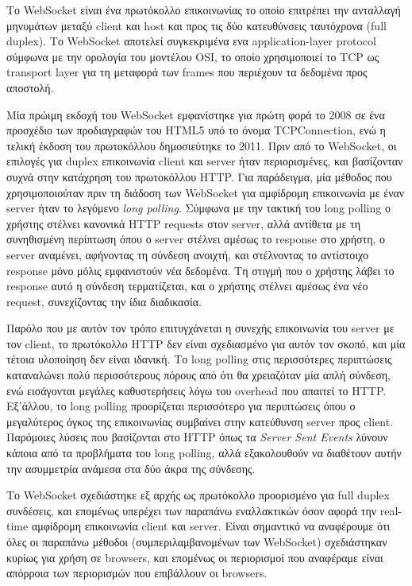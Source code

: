 \documentclass[../thesis.tex]{subfiles}
\begin{document}
Το WebSocket είναι ένα πρωτόκολλο επικοινωνίας το οποίο επιτρέπει την ανταλλαγή μηνυμάτων μεταξύ client και host και προς τις δύο κατευθύνσεις ταυτόχρονα (full duplex).
Το WebSocket αποτελεί συγκεκριμένα ενα application-layer protocol σύμφωνα με την ορολογία του μοντέλου OSI, το οποίο χρησιμοποιεί το TCP ως transport layer για τη μεταφορά των frames που περιέχουν τα δεδομένα προς αποστολή.

\bigskip

Μία πρώιμη εκδοχή του WebSocket εμφανίστηκε για πρώτη φορά το 2008 σε ένα προσχέδιο των προδιαγραφών του HTML5 υπό το όνομα TCPConnection, ενώ η τελική έκδοση του πρωτοκόλλου δημοσιεύτηκε το 2011.
Πριν από το WebSocket, οι επιλογές για duplex επικοινωνία client και server ήταν περιορισμένες, και βασίζονταν συχνά στην κατάχρηση του πρωτοκόλλου HTTP.
Για παράδειγμα, μία μέθοδος που χρησιμοποιούταν πριν τη διάδοση των WebSocket για αμφίδρομη επικοινωνία με έναν server ήταν το λεγόμενο \textit{long polling}.
Σύμφωνα με την τακτική του long polling ο χρήστης στέλνει κανονικά HTTP requests στον server, αλλά αντίθετα με τη συνηθισμένη περίπτωση όπου ο server στέλνει αμέσως το response στο χρήστη, ο server αναμένει, αφήνοντας τη σύνδεση ανοιχτή, και στέλνοντας το αντίστοιχο response μόνο μόλις εμφανιστούν νέα δεδομένα.
Τη στιγμή που ο χρήστης λάβει το response αυτό η σύνδεση τερματίζεται, και ο χρήστης στέλνει αμέσως ένα νέο request, συνεχίζοντας την ίδια διαδικασία.

\bigskip

Παρόλο που με αυτόν τον τρόπο επιτυγχάνεται η συνεχής επικοινωνία του server με τον client, το πρωτόκολλο HTTP δεν είναι σχεδιασμένο για αυτόν τον σκοπό, και μία τέτοια υλοποίηση δεν είναι ιδανική.
Το long polling στις περισσότερες περιπτώσεις καταναλώνει πολύ περισσότερους πόρους από ότι θα χρειαζόταν μία απλή σύνδεση, ενώ εισάγονται μεγάλες καθυστερήσεις λόγω του overhead που απαιτεί το HTTP.
Εξ'άλλου, το long polling προορίζεται περισσότερο για περιπτώσεις όπου ο μεγαλύτερος όγκος της επικοινωνίας συμβαίνει στην κατεύθυνση server προς client.
Παρόμοιες λύσεις που βασίζονται στο HTTP όπως τα \textit{Server Sent Events} λύνουν κάποια από τα προβλήματα του long polling, αλλά εξακολουθούν να διαθέτουν αυτήν την ασυμμετρία ανάμεσα στα δύο άκρα της σύνδεσης.

\bigskip

Το WebSocket σχεδιάστηκε εξ αρχής ως πρωτόκολλο προορισμένο για full duplex συνδέσεις, και επομένως υπερέχει των παραπάνω εναλλακτικών όσον αφορά την real-time αμφίδρομη επικοινωνία client και server.
Είναι σημαντικό να αναφέρουμε ότι όλες οι παραπάνω μέθοδοι (συμπεριλαμβανομένων των WebSocket) σχεδιάστηκαν κυρίως για χρήση σε browsers, και επομένως οι περιορισμοί που αναφέραμε είναι απόρροια των περιορισμών που επιβάλλουν οι browsers.
\end{document}
